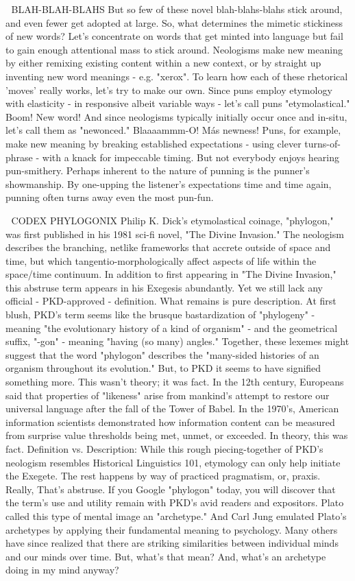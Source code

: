 
BLAH-BLAH-BLAHS
But so few of these novel blah-blahs-blahs stick around, and even fewer get adopted at large. So, what determines the mimetic stickiness of new words?
Let's concentrate on words that get minted into language but fail to gain enough attentional mass to stick around.
Neologisms make new meaning by either remixing existing content within a new context, or by straight up inventing new word meanings - e.g. "xerox".
To learn how each of these rhetorical 'moves' really works, let's try to make our own.
Since puns employ etymology with elasticity - in responsive albeit variable ways - let's call puns "etymolastical."
Boom! New word!
And since neologisms typically initially occur once and in-situ, let's call them as "newonced."
Blaaaammm-O! Más newness!
Puns, for example, make new meaning by breaking established expectations - using clever turns-of-phrase - with a knack for impeccable timing. But not everybody enjoys hearing pun-smithery.
Perhaps inherent to the nature of punning is the punner's showmanship. By one-upping the listener's expectations time and time again, punning often turns away even the most pun-fun.


CODEX PHYLOGONIX
Philip K. Dick's etymolastical coinage, "phylogon," was first published in his 1981 sci-fi novel, "The Divine Invasion." The neologism describes the branching, netlike frameworks that accrete outside of space and time, but which tangentio-morphologically affect aspects of life within the space/time continuum.
In addition to first appearing in "The Divine Invasion," this abstruse term appears in his Exegesis abundantly. Yet we still lack any official - PKD-approved - definition. What remains is pure description.
At first blush, PKD's term seems like the brusque bastardization of "phylogeny" - meaning "the evolutionary history of a kind of organism" - and the geometrical suffix, "-gon" - meaning "having (so many) angles."
Together, these lexemes might suggest that the word "phylogon" describes the "many-sided histories of an organism throughout its evolution."
But, to PKD it seems to have signified something more.
This wasn't theory; it was fact.
In the 12th century, Europeans said that properties of "likeness" arise from mankind's attempt to restore our universal language after the fall of the Tower of Babel.
In the 1970's, American information scientists demonstrated how information content can be measured from surprise value thresholds being met, unmet, or exceeded.
In theory, this was fact.
Definition vs. Description:
While this rough piecing-together of PKD's neologism resembles Historical Linguistics 101, etymology can only help initiate the Exegete. The rest happens by way of practiced pragmatism, or, praxis.
Really,
That's abstruse.
If you Google "phylogon" today, you will discover that the term's use and utility remain with PKD's avid readers and expositors.
Plato called this type of mental image an "archetype." And Carl Jung emulated Plato's archetypes by applying their fundamental meaning to psychology. Many others have since realized that there are striking similarities between individual minds and our minds over time. But, what's that mean? And, what's an archetype doing in my mind anyway?

